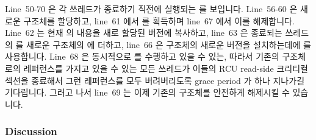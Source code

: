 Line~50-70 은 각 쓰레드가 종료하기 직전에 실행되는
 를 보입니다.
Line~56-60 은 새로운  구조체를 할당하고, line~61 에서
 를 획득하며 line~67 에서 이를 해제합니다.
Line~62 는 현재  의 내용을 새로 할당된 버전에 복사하고, line~63
은 종료되는 쓰레드의  를 새로운 구조체의  에 더하고,
line~66 은  구조체의 새로운 버전을 설치하는데에
 를 사용합니다.
Line~68 은 동시적으로  를 수행하고 있을 수 있는, 따라서 기존의
 구조체로의 레퍼런스를 가지고 있을 수 있는 모든 쓰레드가 이들의
RCU read-side 크리티컬 섹션을 종료해서 그런 레퍼런스를 모두 버려버리도록 grace
period 가 하나 지나가길 기다립니다.
그러고 나서 line~69 는 이제 기존의  구조체를 안전하게 해제시킬
수 있습니다.
\iffalse

Lines~50-70 shows \co{count_unregister_thread()}, which is invoked
by each thread just before it exits.
Lines~56-60 allocate a new \co{countarray} structure,
line~61 acquires \co{final_mutex} and line~67 releases it.
Line~62 copies the contents of the current \co{countarray} into
the newly allocated version, line~63 adds the exiting thread's \co{counter}
to new structure's \co{->total}, and line~64 \co{NULL}s the exiting thread's
\co{counterp[]} array element.
Line~65 then retains a pointer to the current (soon to be old)
\co{countarray} structure, and line~66 uses \co{rcu_assign_pointer()}
to install the new version of the \co{countarray} structure.
Line~68 waits for a grace period to elapse, so that any threads that
might be concurrently executing in \co{read_count()}, and thus might
have references to the old \co{countarray} structure, will be allowed
to exit their RCU read-side critical sections, thus dropping any such
references.
Line~69 can then safely free the old \co{countarray} structure.
\fi

\subsubsection{Discussion}


